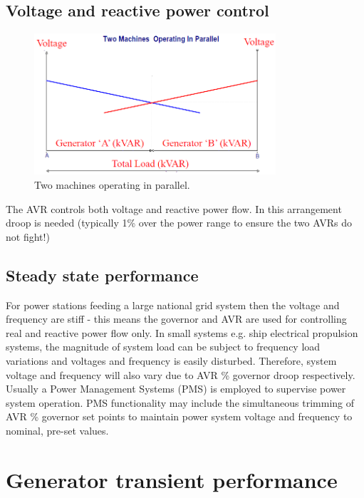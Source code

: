 \subsection{Voltage and reactive power control}
\begin{figure}[H]
    \centering
    \includegraphics[width = 0.8\textwidth]{img/figure84.png}
    \caption{Two machines operating in parallel.}
\end{figure}
The AVR controls both voltage and reactive power flow. In this arrangement droop is needed (typically 1\% over the power range to ensure the two AVRs do not fight!)
\subsection{Steady state performance}
For power stations feeding a large national grid system then the voltage and frequency are stiff - this means the governor and AVR are used for controlling real and reactive power flow only. In small systems e.g. ship electrical propulsion systems, the magnitude of system load can be subject to frequency load variations and voltages and frequency is easily disturbed. Therefore, system voltage and frequency will also vary due to AVR \% governor droop respectively. Usually a Power Management Systems (PMS) is employed to supervise power system operation. PMS functionality may include the simultaneous trimming of AVR \% governor set points to maintain power system voltage and frequency to nominal, pre-set values.
\section{Generator transient performance}
